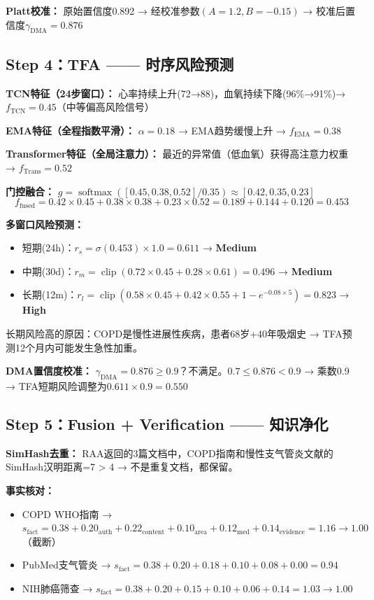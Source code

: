 \documentclass[11pt,a4paper]{ctexart}
\DeclareMathOperator{\softmax}{softmax}
\DeclareMathOperator{\clip}{clip}
\begin{document}
\textbf{Platt校准：} 原始置信度0.892 → 经校准参数$(A=1.2, B=-0.15)$ → 校准后置信度$\gamma_{\text{DMA}} = 0.876$

\subsection{Step 4：TFA —— 时序风险预测}

\textbf{TCN特征（24步窗口）：} 心率持续上升(72→88)，血氧持续下降(96\%→91\%)→ $f_{\text{TCN}} = 0.45$（中等偏高风险信号）

\textbf{EMA特征（全程指数平滑）：} $\alpha=0.18$ → EMA趋势缓慢上升 → $f_{\text{EMA}} = 0.38$

\textbf{Transformer特征（全局注意力）：} 最近的异常值（低血氧）获得高注意力权重 → $f_{\text{Trans}} = 0.52$

\textbf{门控融合：} $g = \softmax([0.45, 0.38, 0.52] / 0.35) \approx [0.42, 0.35, 0.23]$
$$f_{\text{fused}} = 0.42 \times 0.45 + 0.38 \times 0.38 + 0.23 \times 0.52 = 0.189 + 0.144 + 0.120 = 0.453$$

\textbf{多窗口风险预测：}
\begin{itemize}[nosep]
\item 短期(24h)：$r_s = \sigma(0.453) \times 1.0 = 0.611$ → \textbf{Medium}
\item 中期(30d)：$r_m = \clip(0.72 \times 0.45 + 0.28 \times 0.61) = 0.496$ → \textbf{Medium}
\item 长期(12m)：$r_l = \clip(0.58 \times 0.45 + 0.42 \times 0.55 + 1-e^{-0.08 \times 5}) = 0.823$ → \textbf{High}
\end{itemize}

长期风险高的原因：COPD是慢性进展性疾病，患者68岁+40年吸烟史 → TFA预测12个月内可能发生急性加重。

\textbf{DMA置信度校准：} $\gamma_{\text{DMA}} = 0.876 \geq 0.9$？不满足。$0.7 \leq 0.876 < 0.9$ → 乘数0.9 → TFA短期风险调整为$0.611 \times 0.9 = 0.550$

\subsection{Step 5：Fusion + Verification —— 知识净化}

\textbf{SimHash去重：} RAA返回的3篇文档中，COPD指南和慢性支气管炎文献的SimHash汉明距离=7 > 4 → 不是重复文档，都保留。

\textbf{事实核对：}
\begin{itemize}[nosep]
\item COPD WHO指南 → $s_{\text{fact}} = 0.38 + 0.20_{\text{auth}} + 0.22_{\text{content}} + 0.10_{\text{area}} + 0.12_{\text{med}} + 0.14_{\text{evidence}} = 1.16 \to 1.00$（截断）\checkmark
\item PubMed支气管炎 → $s_{\text{fact}} = 0.38 + 0.20 + 0.18 + 0.10 + 0.08 + 0.00 = 0.94$ \checkmark
\item NIH肺癌筛查 → $s_{\text{fact}} = 0.38 + 0.20 + 0.15 + 0.10 + 0.06 + 0.14 = 1.03 \to 1.00$ \checkmark
\end{itemize}
\end{document}
